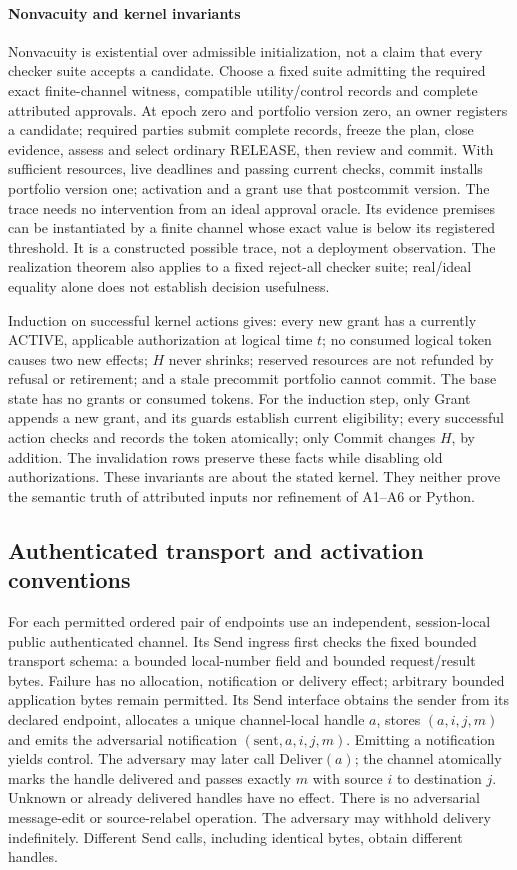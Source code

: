 \paragraph{Nonvacuity and kernel invariants}
Nonvacuity is existential over admissible initialization, not a claim that
every checker suite accepts a candidate. Choose a fixed suite admitting
the required exact finite-channel witness, compatible utility/control
records and complete attributed approvals. At epoch zero and portfolio version
zero, an owner registers a candidate; required parties submit complete
records, freeze the plan, close evidence, assess and select ordinary RELEASE,
then review and commit. With sufficient resources, live deadlines and
passing current checks, commit installs portfolio version one; activation
and a grant use that postcommit version. The trace needs no intervention
from an ideal approval oracle. Its evidence premises can be instantiated
by a finite channel whose exact value is below its registered threshold.
It is a constructed possible trace, not a deployment observation.
The realization theorem also applies to a fixed reject-all checker suite;
real/ideal equality alone does not establish decision usefulness.

Induction on successful kernel actions gives: every new grant has a
currently ACTIVE, applicable authorization at logical time $t$; no
consumed logical token causes two new effects; $H$ never shrinks; reserved
resources are not refunded by refusal or retirement; and a stale
precommit portfolio cannot commit. The base state has no grants or
consumed tokens. For the induction step, only Grant appends a new grant,
and its guards establish current eligibility; every successful action
checks and records the token atomically; only Commit changes $H$, by
addition. The invalidation rows preserve these facts while disabling
old authorizations. These invariants are about the stated kernel.
They neither prove the semantic truth of attributed inputs nor refinement
of A1--A6 or Python.

\subsection{Authenticated transport and activation conventions}
\label{app:uc-channel}
For each permitted ordered pair of endpoints use an independent,
session-local public authenticated channel. Its Send ingress first checks
the fixed bounded transport schema: a bounded local-number field and
bounded request/result bytes. Failure has no allocation, notification or
delivery effect; arbitrary bounded application bytes remain permitted.
Its Send interface obtains
the sender from its declared endpoint, allocates a unique channel-local
handle $a$, stores $(a,i,j,m)$ and emits the adversarial notification
$(\mathrm{sent},a,i,j,m)$. Emitting a notification yields control.
The adversary may later call Deliver$(a)$; the channel atomically marks
the handle delivered and passes exactly $m$ with source $i$ to destination
$j$. Unknown or already delivered handles have no effect. There is no
adversarial message-edit or source-relabel operation.
The adversary may withhold delivery indefinitely.
Different Send calls, including identical bytes, obtain different handles.

